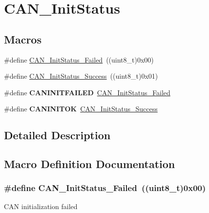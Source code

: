 \hypertarget{group___c_a_n___init_status}{\section{C\-A\-N\-\_\-\-Init\-Status}
\label{group___c_a_n___init_status}
}
\subsection*{Macros}
\begin{DoxyCompactItemize}
\item 
\#define \hyperlink{group___c_a_n___init_status_ga095c319e8c54c974eb2b6eeadf180d96}{C\-A\-N\-\_\-\-Init\-Status\-\_\-\-Failed}~((uint8\-\_\-t)0x00)
\item 
\#define \hyperlink{group___c_a_n___init_status_ga6bed5957af8f2f6b00568e15ccac5772}{C\-A\-N\-\_\-\-Init\-Status\-\_\-\-Success}~((uint8\-\_\-t)0x01)
\item 
\hypertarget{group___c_a_n___init_status_ga0539a9e5a898fcd71c4dcb7e341e4b86}{\#define {\bfseries C\-A\-N\-I\-N\-I\-T\-F\-A\-I\-L\-E\-D}~\hyperlink{group___c_a_n___init_status_ga095c319e8c54c974eb2b6eeadf180d96}{C\-A\-N\-\_\-\-Init\-Status\-\_\-\-Failed}}\label{group___c_a_n___init_status_ga0539a9e5a898fcd71c4dcb7e341e4b86}

\item 
\hypertarget{group___c_a_n___init_status_ga14cba0b5b506be73e2f45c732f8e54cb}{\#define {\bfseries C\-A\-N\-I\-N\-I\-T\-O\-K}~\hyperlink{group___c_a_n___init_status_ga6bed5957af8f2f6b00568e15ccac5772}{C\-A\-N\-\_\-\-Init\-Status\-\_\-\-Success}}\label{group___c_a_n___init_status_ga14cba0b5b506be73e2f45c732f8e54cb}

\end{DoxyCompactItemize}


\subsection{Detailed Description}


\subsection{Macro Definition Documentation}
\hypertarget{group___c_a_n___init_status_ga095c319e8c54c974eb2b6eeadf180d96}{
\subsubsection[{C\-A\-N\-\_\-\-Init\-Status\-\_\-\-Failed}]{\setlength{\rightskip}{0pt plus 5cm}\#define C\-A\-N\-\_\-\-Init\-Status\-\_\-\-Failed~((uint8\-\_\-t)0x00)}}\label{group___c_a_n___init_status_ga095c319e8c54c974eb2b6eeadf180d96}
C\-A\-N initialization failed 

